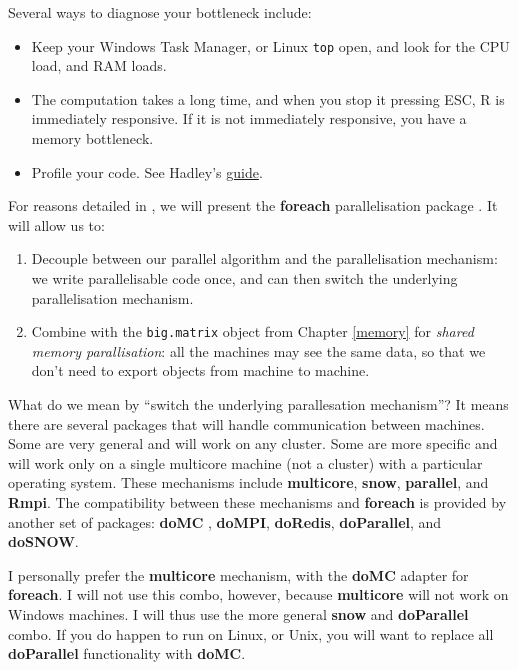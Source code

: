 \documentclass[]{book}
\providecommand{\tightlist}{%
  \setlength{\itemsep}{0pt}\setlength{\parskip}{0pt}}
\theoremstyle{definition}
\theoremstyle{definition}
\theoremstyle{definition}
\theoremstyle{remark}
\let\BeginKnitrBlock\begin \let\EndKnitrBlock\end
\begin{document}
Several ways to diagnose your bottleneck include:

\begin{itemize}
\tightlist
\item
  Keep your Windows Task Manager, or Linux \texttt{top} open, and look
  for the CPU load, and RAM loads.
\item
  The computation takes a long time, and when you stop it pressing ESC,
  R is immediately responsive. If it is not immediately responsive, you
  have a memory bottleneck.
\item
  Profile your code. See Hadley's
  \href{http://adv-r.had.co.nz/Profiling.html}{guide}.
\end{itemize}

For reasons detailed in \citet{kane2013scalable}, we will present the
\textbf{foreach} parallelisation package \citep{foreach}. It will allow
us to:

\begin{enumerate}
\def\labelenumi{\arabic{enumi}.}
\item
  Decouple between our parallel algorithm and the parallelisation
  mechanism: we write parallelisable code once, and can then switch the
  underlying parallelisation mechanism.
\item
  Combine with the \texttt{big.matrix} object from Chapter \ref{memory}
  for \emph{shared memory parallisation}: all the machines may see the
  same data, so that we don't need to export objects from machine to
  machine.
\end{enumerate}

What do we mean by ``switch the underlying parallesation mechanism''? It
means there are several packages that will handle communication between
machines. Some are very general and will work on any cluster. Some are
more specific and will work only on a single multicore machine (not a
cluster) with a particular operating system. These mechanisms include
\textbf{multicore}, \textbf{snow}, \textbf{parallel}, and \textbf{Rmpi}.
The compatibility between these mechanisms and \textbf{foreach} is
provided by another set of packages: \textbf{doMC} , \textbf{doMPI},
\textbf{doRedis}, \textbf{doParallel}, and \textbf{doSNOW}.

\BeginKnitrBlock{remark}
{}I personally prefer the \textbf{multicore}
mechanism, with the \textbf{doMC} adapter for \textbf{foreach}. I will
not use this combo, however, because \textbf{multicore} will not work on
Windows machines. I will thus use the more general \textbf{snow} and
\textbf{doParallel} combo. If you do happen to run on Linux, or Unix,
you will want to replace all \textbf{doParallel} functionality with
\textbf{doMC}.
\EndKnitrBlock{remark}
\end{document}
